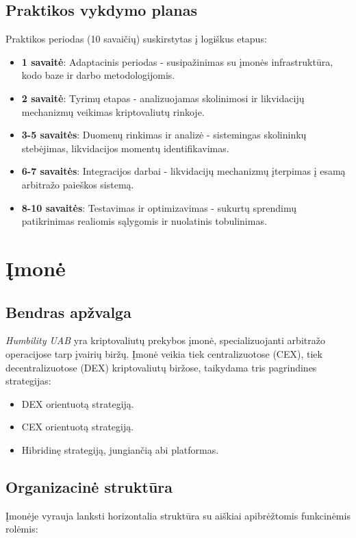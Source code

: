 \documentclass[]{VUMIFTemplateClass}
\begin{document}
\subsection*{Praktikos vykdymo planas}
Praktikos periodas (10 savaičių) suskirstytas į logiškus etapus:

\begin{itemize}
\item \textbf{1 savaitė}: Adaptacinis periodas - susipažinimas su įmonės infrastruktūra, kodo baze ir darbo metodologijomis.

\item \textbf{2 savaitė}: Tyrimų etapas - analizuojamas skolinimosi ir likvidacijų mechanizmų veikimas kriptovaliutų rinkoje.

\item \textbf{3-5 savaitės}: Duomenų rinkimas ir analizė - sistemingas skolininkų stebėjimas, likvidacijos momentų identifikavimas.

\item \textbf{6-7 savaitės}: Integracijos darbai - likvidacijų mechanizmų įterpimas į esamą arbitražo paieškos sistemą.

\item \textbf{8-10 savaitės}: Testavimas ir optimizavimas - sukurtų sprendimų patikrinimas realiomis sąlygomis ir nuolatinis tobulinimas.
\end{itemize}

\section{Įmonė}

\subsection{Bendras apžvalga}
\textit{Humbility UAB} yra kriptovaliutų prekybos įmonė, specializuojanti arbitražo operacijose tarp įvairių biržų. Įmonė veikia tiek centralizuotose (CEX), tiek decentralizuotose (DEX) kriptovaliutų biržose, taikydama tris pagrindines strategijas:
\begin{itemize}
\item DEX orientuotą strategiją.
\item CEX orientuotą strategiją.
\item Hibridinę strategiją, jungiančią abi platformas.
\end{itemize}

\subsection{Organizacinė struktūra}
Įmonėje vyrauja lanksti horizontalia struktūra su aiškiai apibrėžtomis funkcinėmis rolėmis:
\end{document}
